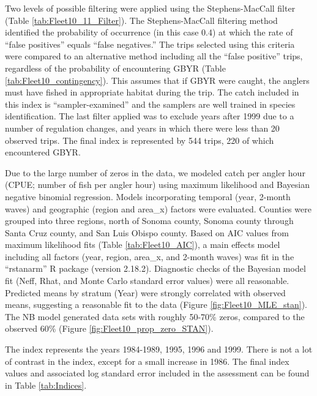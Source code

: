 \documentclass[12pt,]{article}
\begin{document}
Two levels of possible filtering were applied using the Stephens-MacCall
filter (Table \ref{tab:Fleet10_11_Filter}). The Stephens-MacCall
filtering method identified the probability of occurrence (in this case
0.4) at which the rate of ``false positives'' equals ``false
negatives.'' The trips selected using this criteria were compared to an
alternative method including all the ``false positive'' trips,
regardless of the probability of encountering GBYR (Table
\ref{tab:Fleet10_contingency}). This assumes that if GBYR were caught,
the anglers must have fished in appropriate habitat during the trip. The
catch included in this index is ``sampler-examined'' and the samplers
are well trained in species identification. The last filter applied was
to exclude years after 1999 due to a number of regulation changes, and
years in which there were less than 20 observed trips. The final index
is represented by 544 trips, 220 of which encountered GBYR.

Due to the large number of zeros in the data, we modeled catch per
angler hour (CPUE; number of fish per angler hour) using maximum
likelihood and Bayesian negative binomial regression. Models
incorporating temporal (year, 2-month waves) and geographic (region and
area\_x) factors were evaluated. Counties were grouped into three
regions, north of Sonoma county, Sonoma county through Santa Cruz
county, and San Luis Obispo county. Based on AIC values from maximum
likelihood fits (Table \ref{tab:Fleet10_AIC}), a main effects model
including all factors (year, region, area\_x, and 2-month waves) was fit
in the ``rstanarm'' R package (version 2.18.2). Diagnostic checks of the
Bayesian model fit (Neff, Rhat, and Monte Carlo standard error values)
were all reasonable. Predicted means by stratum (Year) were strongly
correlated with observed means, suggesting a reasonable fit to the data
(Figure \ref{fig:Fleet10_MLE_stan}). The NB model generated data sets
with roughly 50-70\% zeros, compared to the observed 60\% (Figure
\ref{fig:Fleet10_prop_zero_STAN}).

The index represents the years 1984-1989, 1995, 1996 and 1999. There is
not a lot of contrast in the index, except for a small increase in 1986.
The final index values and associated log standard error included in the
assessment can be found in Table \ref{tab:Indices}.
\end{document}
